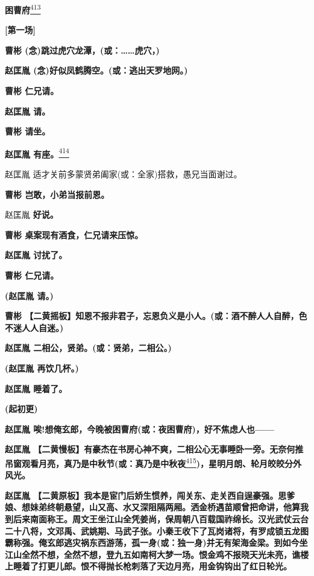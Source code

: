 \newpage
{} %
\textbf{困曹府}\protect\hyperlink{fn413}{\textsuperscript{413}}

\textbf{{[}第一场{]}}

\textbf{曹彬 (念)跳过虎穴龙潭，(或：\ldots{}\ldots{}虎穴，)}

\textbf{赵匡胤 (念)好似凤鹤腾空。(或：逃出天罗地网。)}

\textbf{曹彬 仁兄请。}

\textbf{赵匡胤 请。}

\textbf{曹彬 请坐。}

\textbf{赵匡胤 有座。}\protect\hyperlink{fn414}{\textsuperscript{414}}

赵匡胤 适才关前多蒙贤弟阖家(或：全家)搭救，愚兄当面谢过。

\textbf{曹彬 岂敢，小弟当报前恩。}

赵匡胤 \textbf{好说。}

\textbf{曹彬 桌案现有酒食，仁兄请来压惊。}

\textbf{赵匡胤 讨扰了。}

\textbf{曹彬 仁兄请。}

\textbf{(赵匡胤 请。)}

\textbf{曹彬
【二黄摇板】知恩不报非君子，忘恩负义是小人。(或：酒不醉人人自醉，色不迷人人自迷。)}

\textbf{赵匡胤 二相公，贤弟。(或：贤弟，二相公。)}

\textbf{(赵匡胤 再饮几杯。)}

\textbf{赵匡胤 睡着了。}

\textbf{(起初更)}

\textbf{赵匡胤
唉!想俺玄郎，今晚被困曹府(或：夜困曹府)，好不焦虑人也------}

\textbf{赵匡胤
【二黄慢板】有豪杰在书房心神不爽，二相公心无事睡卧一旁。无奈何推吊窗观看月亮，真乃是中秋节(或：真乃是中秋夜}\protect\hyperlink{fn415}{\textsuperscript{415}}\textbf{)，星明月朗、轮月皎皎分外风光。}

\textbf{赵匡胤
【二黄原板】我本是宦门后娇生惯养，闯关东、走关西自逞豪强。思爹娘、想妹弟终朝悬望，山又高、水又深阻隔两厢。洒金桥遇苗顺曾把命讲，他算我到后来南面称王。周文王坐江山全凭姜尚，保周朝八百载国祚绵长。汉光武仗云台二十八将，文邓禹、武姚期、马武子张。小秦王收下了瓦岗诸将，有罗成锁五龙图霸称强。俺玄郎逃灾祸东西游荡，孤一身(或：独一身)并无有架海金梁。到如今坐江山全然不想，全然不想，登九五如南柯大梦一场。恨金鸡不报晓天光未亮，谯楼上睡着了打更儿郎。恨不得抛长枪刺落了天边月亮，用金钩钩出了红日轮光。}

